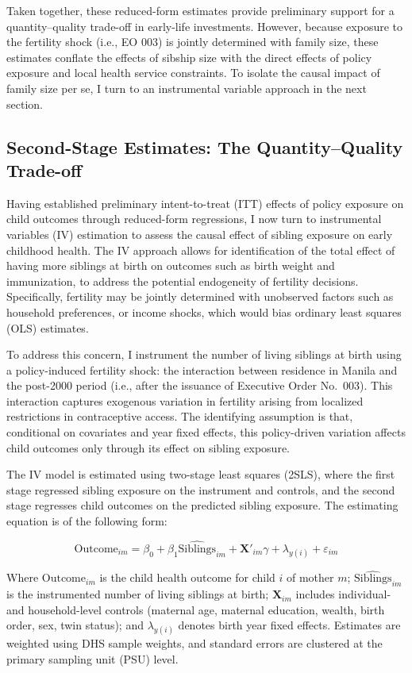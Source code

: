 \documentclass[]{AEA}
\begin{document}
Taken together, these reduced-form estimates provide preliminary support
for a quantity--quality trade-off in early-life investments. However,
because exposure to the fertility shock (i.e., EO 003) is jointly
determined with family size, these estimates conflate the effects of
sibship size with the direct effects of policy exposure and local health
service constraints. To isolate the causal impact of family size per se,
I turn to an instrumental variable approach in the next section.

\subsection{Second-Stage Estimates: The Quantity–Quality Trade-off}

Having established preliminary intent-to-treat (ITT) effects of policy
exposure on child outcomes through reduced-form regressions, I now turn
to instrumental variables (IV) estimation to assess the causal effect of
sibling exposure on early childhood health. The IV approach allows for
identification of the total effect of having more siblings at birth on
outcomes such as birth weight and immunization, to address the potential
endogeneity of fertility decisions. Specifically, fertility may be
jointly determined with unobserved factors such as household
preferences, or income shocks, which would bias ordinary least squares
(OLS) estimates.

To address this concern, I instrument the number of living siblings at
birth using a policy-induced fertility shock: the interaction between
residence in Manila and the post-2000 period (i.e., after the issuance
of Executive Order No.~003). This interaction captures exogenous
variation in fertility arising from localized restrictions in
contraceptive access. The identifying assumption is that, conditional on
covariates and year fixed effects, this policy-driven variation affects
child outcomes only through its effect on sibling exposure.

The IV model is estimated using two-stage least squares (2SLS), where
the first stage regressed sibling exposure on the instrument and
controls, and the second stage regresses child outcomes on the predicted
sibling exposure. The estimating equation is of the following form:

\[
\text{Outcome}_{im} = \beta_0 + \beta_1 \widehat{\text{Siblings}}_{im} + \boldsymbol{X}'_{im}\gamma + \lambda_{y(i)} + \varepsilon_{im}
\]

Where \(\text{Outcome}_{im}\) is the child health outcome for child
\(i\) of mother \(m\); \(\widehat{\text{Siblings}}_{im}\) is the
instrumented number of living siblings at birth; \(\boldsymbol{X}_{im}\)
includes individual- and household-level controls (maternal age,
maternal education, wealth, birth order, sex, twin status); and
\(\lambda_{y(i)}\) denotes birth year fixed effects. Estimates are
weighted using DHS sample weights, and standard errors are clustered at
the primary sampling unit (PSU) level.
\end{document}
